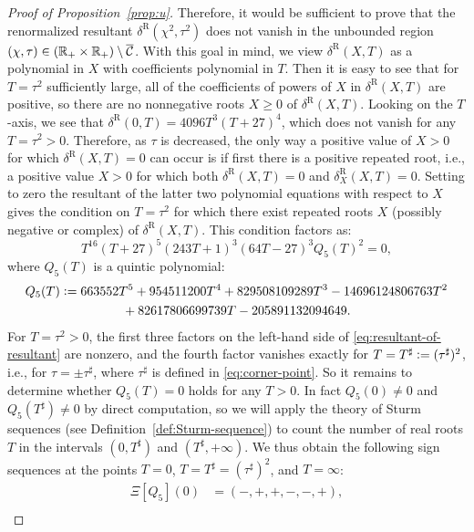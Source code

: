 \begin{proof}[Proof of Proposition~\ref{prop:u}]
Therefore, it would be sufficient to prove that the renormalized resultant $\delta^\mathrm{R}(\chi^2,\tau^2)$ does not vanish in the unbounded region $(\chi,\tau)\in(\mathbb{R}_+\times\mathbb{R}_+)\setminus\overline{\mathcal{C}}$.  With this goal in mind, we view $\delta^\mathrm{R}(X,T)$ as a polynomial in $X$ with coefficients polynomial in $T$.
Then it is easy to see that for $T=\tau^2$ sufficiently large, all of the coefficients of powers of $X$ in $\delta^\mathrm{R}(X,T)$ are positive, so there are no nonnegative roots $X\ge 0$ of $\delta^\mathrm{R}(X,T)$.  Looking on the $T$-axis, we see that $\delta^\mathrm{R}(0,T)=4096T^3(T+27)^4$, which does not vanish for any $T=\tau^2>0$.  Therefore, as $\tau$ is decreased, the only way a positive value of $X>0$ for which $\delta^\mathrm{R}(X,T)=0$ can occur is if first there is a positive repeated root, i.e., a positive value $X>0$ for which both $\delta^\mathrm{R}(X,T)=0$ and $\delta^\mathrm{R}_X(X,T)=0$.  Setting to zero the resultant of the latter two polynomial equations with respect to $X$ gives the condition on $T=\tau^2$ for which there exist repeated roots $X$ (possibly negative or complex) of $\delta^\mathrm{R}(X,T)$.  This condition factors as:
\begin{equation}
T^{16}(T+27)^5(243T+1)^3(64T-27)^3Q_5(T)^2=0,
\label{eq:resultant-of-resultant}
\end{equation}
where $Q_5(T)$ is a quintic polynomial:
\begin{multline}
Q_5(T)\vcentcolon= 663552T^5+954511200T^4+829508109289T^3-14696124806763T^2\\
{}+82617806699739T-205891132094649.
\end{multline}
For $T=\tau^2>0$, the first three factors on the left-hand side of \eqref{eq:resultant-of-resultant} are nonzero, and the fourth factor vanishes exactly for $T=T^\sharp\vcentcolon= (\tau^\sharp)^2$, i.e., for $\tau=\pm\tau^\sharp$, where $\tau^\sharp$ is defined in \eqref{eq:corner-point}.  So it remains to determine whether $Q_5(T)=0$ holds for any $T>0$.  In fact $Q_5(0)\neq 0$ and $Q_5(T^\sharp)\neq 0$ by direct computation, so we will apply the theory of Sturm sequences (see Definition~\ref{def:Sturm-sequence}) to count the number of real roots $T$ in the intervals $(0,T^\sharp)$ and $(T^\sharp,+\infty)$.
We thus obtain the following sign sequences at the points $T=0$, $T=T^\sharp=(\tau^\sharp)^2$, and $T=\infty$:
\begin{equation}
\begin{split}
\Xi[Q_5](0)&=(-,+,+,-,-,+),\\

\end{split}
\end{equation}
\end{proof}
